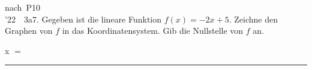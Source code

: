 \documentclass[11pt]{article}
\newcommand{\gpassend}[1]{\sbox{\gpbox}{#1}\ifdim\wd\gpbox>\linewidth\resizebox{\linewidth}{!}{\usebox{\gpbox}}\else\usebox{\gpbox}\fi}
\def\gkopfnach{}
\newcommand{\gkopfvor}[1]{\gdef\gkopfnach{#1}}
\newcommand{\linie}[1]{\,{\color{black!45}\rule[-1pt]{#1}{0.4pt}}\,}
\newcommand{\pkt}{\textperiodcentered{}}
\begin{document}
\gkopfvor{\pfstufekopf{Nullstelle}{selten \pkt{} \pfjahre{22}{19}}}
\begin{pfaufg}{nach~P10\\’22~\pkt{}~3a}{7.}{}
Gegeben ist die lineare Funktion $f(x) = -2x + 5$. Zeichne den Graphen von $f$ in das Koordinatensystem. Gib die Nullstelle von $f$ an.
\par\smallskip\noindent\gpassend{\begin{ksys}[xmin=-2,xmax=4,ymin=-2,ymax=6,karo=0.35]\end{ksys}}\par
\par\noindent\hfill x $=$\linie{30mm}
\end{pfaufg}
\end{document}
